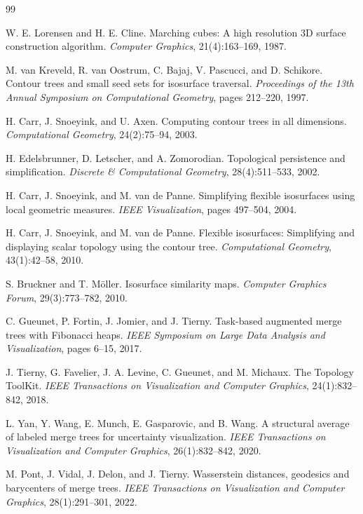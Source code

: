 \documentclass[twocolumn, a4paper, 10pt]{article}
\begin{document}
\clearpage
\begin{thebibliography}{99}

W. E. Lorensen and H. E. Cline.
Marching cubes: A high resolution 3D surface construction algorithm.
\textit{Computer Graphics}, 21(4):163--169, 1987.

M. van Kreveld, R. van Oostrum, C. Bajaj, V. Pascucci, and D. Schikore.
Contour trees and small seed sets for isosurface traversal.
\textit{Proceedings of the 13th Annual Symposium on Computational Geometry}, pages 212--220, 1997.

H. Carr, J. Snoeyink, and U. Axen.
Computing contour trees in all dimensions.
\textit{Computational Geometry}, 24(2):75--94, 2003.

H. Edelsbrunner, D. Letscher, and A. Zomorodian.
Topological persistence and simplification.
\textit{Discrete \& Computational Geometry}, 28(4):511--533, 2002.

H. Carr, J. Snoeyink, and M. van de Panne.
Simplifying flexible isosurfaces using local geometric measures.
\textit{IEEE Visualization}, pages 497--504, 2004.

H. Carr, J. Snoeyink, and M. van de Panne.
Flexible isosurfaces: Simplifying and displaying scalar topology using the contour tree.
\textit{Computational Geometry}, 43(1):42--58, 2010.

S. Bruckner and T. M\"oller.
Isosurface similarity maps.
\textit{Computer Graphics Forum}, 29(3):773--782, 2010.

C. Gueunet, P. Fortin, J. Jomier, and J. Tierny.
Task-based augmented merge trees with Fibonacci heaps.
\textit{IEEE Symposium on Large Data Analysis and Visualization}, pages 6--15, 2017.

J. Tierny, G. Favelier, J. A. Levine, C. Gueunet, and M. Michaux.
The Topology ToolKit.
\textit{IEEE Transactions on Visualization and Computer Graphics}, 24(1):832--842, 2018.

L. Yan, Y. Wang, E. Munch, E. Gasparovic, and B. Wang.
A structural average of labeled merge trees for uncertainty visualization.
\textit{IEEE Transactions on Visualization and Computer Graphics}, 26(1):832--842, 2020.

M. Pont, J. Vidal, J. Delon, and J. Tierny.
Wasserstein distances, geodesics and barycenters of merge trees.
\textit{IEEE Transactions on Visualization and Computer Graphics}, 28(1):291--301, 2022.


\end{thebibliography}
\end{document}
